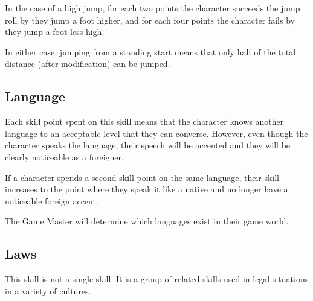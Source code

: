 \begin{multicols*}{2}
In the case of a high jump, for each two points the character succeeds the jump roll by they jump a foot higher, and for each four points the character fails by they jump a foot less high.

In either case, jumping from a standing start means that only half of the total distance (after modification) can be jumped. 


\subsection{Language}\label{skill:Language}
Each skill point spent on this skill means that the character knows another language to an acceptable level that they can converse. However, even though the character speaks the language, their speech will be accented and they will be clearly noticeable as a foreigner.

If a character spends a second skill point on the same language, their skill increases to the point where they speak it like a native and no longer have a noticeable foreign accent.

The Game Master will determine which languages exist in their game world.

\subsection{Laws}\label{skill:Laws}
This skill is not a single skill. It is a group of related skills used in legal situations in a variety of cultures.


\end{multicols*}
